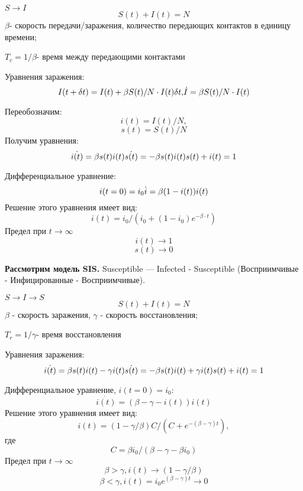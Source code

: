 $S \rightarrow I$
\begin{equation} \label{1problem}
    S(t) + I(t) =N
    \end{equation}
$\beta$- скорость передачи/заражения, количество передающих контактов в единицу времени;

$T_c= 1/\beta$- время между передающими контактами

Уравнения заражения:
\begin{equation}
I(t+\delta t) =I(t) +\beta S(t)/N \cdot I(t)\delta t,
$$ $$
\dot{I}=\beta S(t)/N \cdot I(t)
\end{equation}

Переобозначим: $$ i(t) =I(t)/N,$$ $$s(t) =S(t)/N$$
Получим уравнения:
\begin{equation}
    \dot{i(t)}=\beta s(t)i(t)
    $$ $$
    \dot{s(t)}= - \beta s(t)i(t)
    $$ $$
    s(t) +i(t) = 1
    \end{equation}

Дифференциальное уравнение:
\begin{equation}
    i(t = 0) =i_0
    $$ $$
    \dot{i}=\beta(1 - i(t))i(t)
 \end{equation}
Решение этого уравнения имеет вид:
$$i(t) = i_0/(i_0+ (1 - i_0)e^{-\beta\cdot t} )$$
Предел при $ t \rightarrow \infty $
$$ i(t) \rightarrow 1$$
$$ s(t) \rightarrow 0$$




\textbf{Рассмотрим модель SIS.}
Susceptible — Infected - Susceptible (Восприимчивые - Инфицированные - Восприимчивые).

$S \rightarrow I \rightarrow S$
\begin{equation}
    S(t) + I(t) =N
    \end{equation}
$\beta$ - скорость заражения,
$\gamma$ - скорость восстановления;

$T_r= 1/\gamma$- время восстановления

Уравнения заражения:
\begin{equation}
    \dot{i(t)}=\beta s(t)i(t) -\gamma i(t)
    $$ $$
    \dot{s(t)}= - \beta s(t)i(t)+\gamma i(t)
    $$ $$
    s(t) +i(t) = 1
    \end{equation}

Дифференциальное уравнение,  $i(t = 0) =i_0$:
\begin{equation}
    \dot{i(t)}=(\beta- \gamma - i(t))i(t)
 \end{equation}
Решение этого уравнения имеет вид:
$$i(t) = (1-\gamma / \beta )C/(C+e^{-(\beta -\gamma)t}),$$
где $$C = \beta i_0/(\beta - \gamma -\beta i_0)$$
Предел при $ t \rightarrow \infty $
$$ \beta >\gamma , i(t) \rightarrow (1 -\gamma / \beta)$$
$$ \beta < \gamma ,i(t) = i_0 e^{(\beta -\gamma)t} \rightarrow 0$$



